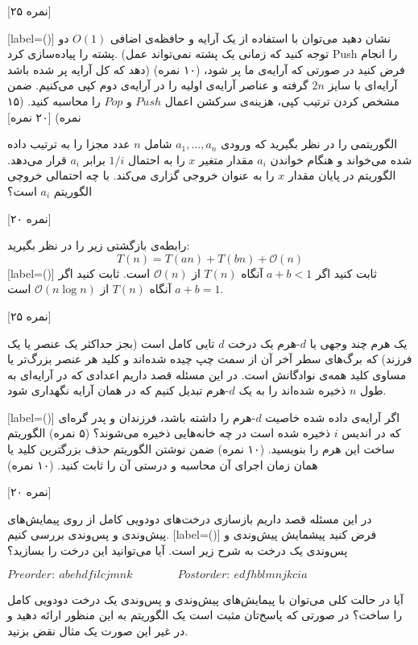 




\medskip


 [۲۵ نمره]

[label=(\alph*)]
 نشان دهید می‌توان با استفاده از یک آرایه و حافظه‌ی اضافی $O(1)$ دو پشته را پیاده‌سازی کرد. (توجه کنید که زمانی یک پشته نمی‌تواند عمل Push را انجام دهد که کل آرایه پر شده باشد) (۱۰ نمره)
 فرض کنید در صورتی که آرایه‌ی ما پر شود، آرایه‌ای با  سایز $ 2n $ گرفته و عناصر آرایه‌ی اولیه را در آرایه‌ی دوم کپی می‌کنیم. ضمن مشخص کردن ترتیب کپی، هزینه‌ی سرکشن اعمال $ Push $ و $ Pop $ را  محاسبه کنید. (۱۵ نمره)
[۲۰ نمره]

الگوریتمی را در نظر بگیرید که ورودی $ a_1, \dots, a_n $ شامل $ n $ عدد مجزا را به ترتیب داده شده می‌خواند و هنگام خواندن $ a_i $ مقدار متغیر $ x $ را به احتمال $ 1/i $ برابر $ a_i $ قرار می‌دهد. الگوریتم در پایان مقدار $ x $ را به عنوان خروجی گزاری می‌کند. با چه احتمالی خروچی الگوریتم $ a_i $ است؟


[۲۰ نمره]

رابطه‌ی بازگشتی زیر را در نظر بگیرید:
$$T(n) = T(an) + T(bn) + \mathcal{O}(n)$$
[label=(\alph*)]
 ثابت کنید اگر $ a + b < 1 $ آنگاه $ T(n) $ از $ \mathcal{O}(n) $ است.
 ثابت کنید اگر $ a + b = 1 $ آنگاه $ T(n) $ از $ \mathcal{O}(n\log{n}) $ است.




[۲۵ نمره]

یک هرم چند وجهی یا
 $ d $-هرم
 یک درخت $ d $ تایی کامل است (بجز حداکثر یک عنصر یا یک فرزند) که برگ‌های سطر آخر آن از سمت چپ چیده شده‌اند و کلید هر عنصر بزرگ‌تر یا مساوی کلید همه‌ی نوادگانش است. در این مسئله قصد داریم اعدادی که در آرایه‌ای به طول $ n $ ذخیره شده‌اند را به یک $ d $-هرم تبدیل کنیم که در همان آرایه نگهداری شود.

[label=(\alph*)]
 اگر آرایه‌ی داده شده خاصیت $ d $-هرم را داشته باشد، فرزندان و پدر گره‌ای که در اندیس  $ i $ ذخیره شده است در چه خانه‌هایی ذخیره می‌شوند؟ (۵ نمره)
 الگوریتم ساخت این هرم را بنویسید. (۱۰ نمره)
 ضمن نوشتن الگوریتم حذف بزرگترین کلید یا همان  زمان اجرای آن محاسبه و درستی آن را ثابت کنید. (۱۰ نمره)

[۲۰ نمره]

در این مسئله قصد داریم بازسازی درخت‌های دودویی کامل از روی پیمایش‌های پیش‌وندی و پس‌وندی بررسی کنیم.
[label=(\alph*)]
 فرض کنید پیشمایش پیش‌وندی و پس‌وندی یک درخت به شرح زیر است. آیا می‌توانید این درخت را بسازید؟
\begin{latin}
$ Preorder:\ abehdfilcjmnk \qquad \qquad Postorder:\ edfhblmnjkcia $
\end{latin}
 آیا در حالت کلی می‌توان با پیمایش‌های پیش‌وندی و پس‌وندی یک درخت دودویی کامل را ساخت؟ در صورتی که پاسخ‌تان مثبت است یک الگوریتم به این منظور ارائه دهید و در غیر این صورت یک مثال نقض بزنید.






